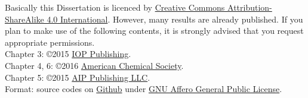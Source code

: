 
 {\small Basically this Dissertation is licenced by \href{https://creativecommons.org/licenses/by-sa/4.0/}{Creative Commons Attribution-ShareAlike 4.0 International}. However, many results are already published. If you plan to make use of the following contents, it is strongly advised that you request appropriate permissions.} \\
 Chapter 3: \copyright 2015 \href{http://ioppublishing.org/}{IOP Publishing}. \\
 Chapter 4, 6: \copyright 2016 \href{http://pubs.acs.org/}{American Chemical Society}. \\
 Chapter 5: \copyright 2015 \href{https://publishing.aip.org/}{AIP Publishing LLC}. \\
 Format: \XeLaTeX \xspace source codes on \href{https://github.com/zczczcle/PhDDissertation}{Github} under \href{https://www.gnu.org/licenses/agpl-3.0.en.html}{GNU Affero General Public License}. 